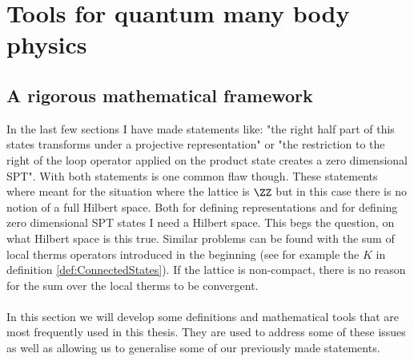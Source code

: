 \chapter{Tools for quantum many body physics}\label{ch:Tools_For_Quantum_many_Body}

\section{A rigorous mathematical framework}
\label{sec:ToolsForQuantumManyBody}
In the last few sections I have made statements like: "the right half part of this states transforms under a projective representation" or "the restriction to the right of the loop operator applied on the product state creates a zero dimensional SPT". With both statements is one common flaw though. These statements where meant for the situation where the lattice is $\ZZ$ but in this case there is no notion of a full Hilbert space. Both for defining representations and for defining zero dimensional SPT states I need a Hilbert space. This begs the question, on what Hilbert space is this true. Similar problems can be found with the sum of local therms operators introduced in the beginning (see for example the $K$ in definition \ref{def:ConnectedStates}). If the lattice is non-compact, there is no reason for the sum over the local therms to be convergent.\\\\
In this section we will develop some definitions and mathematical tools that are most frequently used in this thesis. They are used to address some of these issues as well as allowing us to generalise some of our previously made statements.
